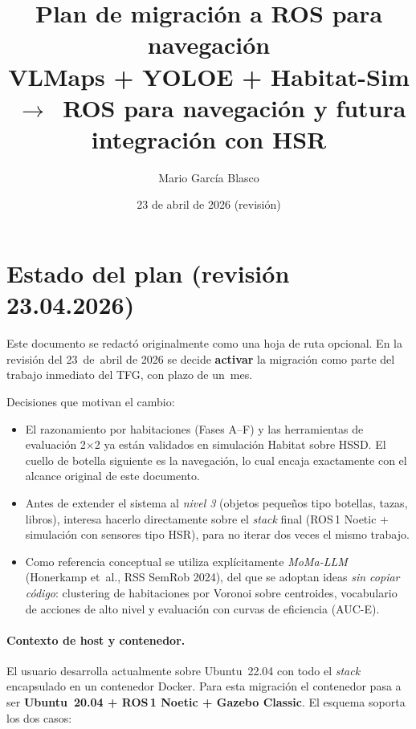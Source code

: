 \documentclass[11pt,a4paper]{article}
\title{\textbf{Plan de migración a ROS para navegación}\\[6pt]
\large VLMaps + YOLOE + Habitat-Sim \,$\rightarrow$\, ROS para navegación y futura integración con HSR}
\author{Mario García Blasco}
\date{23 de abril de 2026 (revisión)}
\begin{document}
\maketitle
\tableofcontents
\newpage

\section*{Estado del plan (revisión 23.04.2026)}

Este documento se redactó originalmente como una hoja de ruta opcional. En la
revisión del 23~de~abril de 2026 se decide \textbf{activar} la migración como
parte del trabajo inmediato del TFG, con plazo de un~mes.

Decisiones que motivan el cambio:

\begin{itemize}
  \item El razonamiento por habitaciones (Fases A--F) y las herramientas de
        evaluación 2$\times$2 ya están validados en simulación Habitat sobre
        HSSD. El cuello de botella siguiente es la navegación, lo cual encaja
        exactamente con el alcance original de este documento.
  \item Antes de extender el sistema al \emph{nivel 3} (objetos pequeños tipo
        botellas, tazas, libros), interesa hacerlo directamente sobre el
        \emph{stack} final (ROS\,1 Noetic + simulación con sensores tipo HSR),
        para no iterar dos veces el mismo trabajo.
  \item Como referencia conceptual se utiliza explícitamente
        \emph{MoMa-LLM} (Honerkamp et~al., RSS SemRob 2024), del que se
        adoptan ideas \emph{sin copiar código}: clustering de habitaciones por
        Voronoi sobre centroides, vocabulario de acciones de alto nivel y
        evaluación con curvas de eficiencia (AUC-E).
\end{itemize}

\paragraph{Contexto de host y contenedor.} El usuario desarrolla actualmente
sobre Ubuntu~22.04 con todo el \emph{stack} encapsulado en un contenedor
Docker. Para esta migración el contenedor pasa a ser
\textbf{Ubuntu~20.04 + ROS\,1 Noetic + Gazebo Classic}. El esquema soporta los
dos casos:
\end{document}

